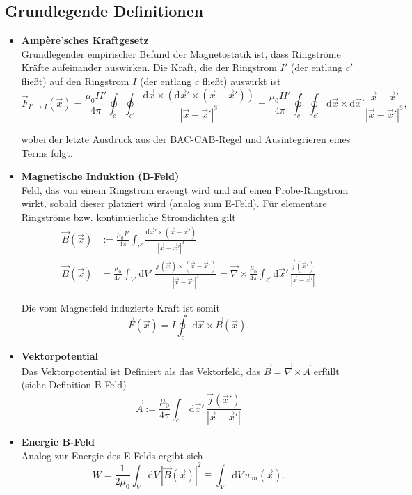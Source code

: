 \documentclass{article}
\newcommand{\diff}{\mathrm{d}}
\begin{document}
\subsection{Grundlegende Definitionen}
\begin{itemize}
	\item \textbf{Ampère'sches Kraftgesetz}\\
	Grundlegender empirischer Befund der Magnetostatik ist, dass Ringströme Kräfte aufeinander auswirken. Die Kraft, die der Ringstrom  $I'$ (der entlang $c'$ fließt) auf den Ringstrom $I$ (der entlang $c$ fließt) auswirkt ist
		\begin{equation}
			\vec{F}_{I'\to I}(\vec{x}) = \frac{\mu_0 I I'}{4\pi} \oint_{c} \oint_{c'} \frac{\diff\vec{x} \times (\diff\vec{x}' \times (\vec{x} - \vec{x}'))}{|\vec{x} - \vec{x}'|^3} = \frac{\mu_0 I I'}{4\pi} \oint_{c} \oint_{c'} \diff\vec{x} \times \diff\vec{x}' \frac{\vec{x} - \vec{x}'}{|\vec{x} - \vec{x}'|^3},
		\end{equation}

	wobei der letzte Ausdruck aus der BAC-CAB-Regel und Ausintegrieren eines Terms folgt.


	\item \textbf{Magnetische Induktion (B-Feld)}\\
	Feld, das von einem Ringstrom erzeugt wird und auf einen Probe-Ringstrom wirkt, sobald dieser platziert wird \textcolor{gruen}{(analog zum E-Feld)}. Für elementare Ringströme bzw. kontinuierliche Stromdichten gilt
		\begin{align}
			\vec{B}(\vec{x}) &:= \frac{\mu_0 I'}{4\pi} \int_{c'} \frac{\diff\vec{x}' \times (\vec{x} - \vec{x}')}{|\vec{x} - \vec{x}'|^3} \\
			\vec{B}(\vec{x}) &= \frac{\mu_0}{4\pi} \int_{V'} \diff V'\, \frac{\vec{j}(\vec{x}) \times (\vec{x} - \vec{x}')}{|\vec{x} - \vec{x}'|^3} = \vec{\nabla} \times \frac{\mu_0}{4\pi} \int_{c'} \diff\vec{x}'\, \frac{\vec{j}(\vec{x}')}{|\vec{x} - \vec{x}'|}
		\end{align}
	
	Die vom Magnetfeld induzierte Kraft ist somit
		\begin{equation}
			\vec{F}(\vec{x}) = I \oint_c \diff\vec{x} \times \vec{B}(\vec{x}).
		\end{equation}
		
	\item \textbf{Vektorpotential}\\
	Das Vektorpotential ist Definiert als das Vektorfeld, das $\vec{B} = \vec{\nabla} \times \vec{A}$ erfüllt (siehe Definition B-Feld)
		\begin{equation}
			\vec{A} := \frac{\mu_0}{4\pi} \int_{c'} \diff\vec{x}'\, \frac{\vec{j}(\vec{x}')}{|\vec{x} - \vec{x}'|}
		\end{equation}
	
	
	\item \textbf{Energie B-Feld}\\
	Analog zur Energie des E-Felds ergibt sich
		\begin{equation}
			W = \frac{1}{2\mu_0} \int_V \diff V\, |\vec{B}(\vec{x})|^2 \equiv \int_V \diff V\, w_m(\vec{x}).
		\end{equation}
\end{itemize}
\end{document}
